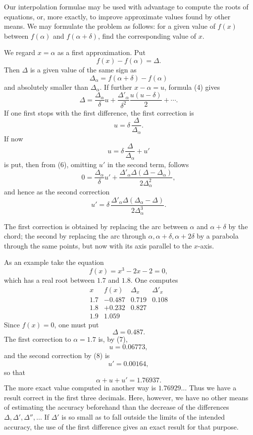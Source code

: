 \documentclass[11pt]{article}
\begin{document}
Our interpolation formulae may be used with advantage to compute the roots of equations, or, more exactly, to improve approximate values found by other means. We may formulate the problem as follows: for a given value of $f(x)$ between $f(\alpha)$ and $f(\alpha+\delta)$, find the corresponding value of $x$.

We regard $x=\alpha$ as a first approximation. Put
\[
        f(x)-f(\alpha)=\Delta.
\]
Then $\Delta$ is a given value of the same sign as
\[
        \Delta_\alpha=f(\alpha+\delta)-f(\alpha)
\]
and absolutely smaller than $\Delta_\alpha$. If further $x-\alpha=u$, formula (4) gives
\begin{equation}
        \Delta=\frac{\Delta_\alpha}{\delta}u+
        \frac{\Delta'_\alpha}{\delta^2}\frac{u(u-\delta)}2+\cdots .
\tag{6}
\end{equation}
If one first stops with the first difference, the first correction is
\begin{equation}
        u=\delta\,\frac{\Delta}{\Delta_\alpha}.
\tag{7}
\end{equation}
If now
\[
        u=\delta\,\frac{\Delta}{\Delta_\alpha}+u'
\]
is put, then from (6), omitting $u'$ in the second term, follows
\[
        0=\frac{\Delta_\alpha}{\delta}u'
        +\frac{\Delta'_\alpha\Delta(\Delta-\Delta_\alpha)}
               {2\Delta_\alpha^2},
\]
and hence as the second correction
\begin{equation}
        u'=\delta\,\frac{\Delta'_\alpha\Delta(\Delta_\alpha-\Delta)}
                     {2\Delta_\alpha^3}.
\tag{8}
\end{equation}

The first correction is obtained by replacing the arc between $\alpha$ and $\alpha+\delta$ by the chord; the second by replacing the arc through $\alpha,\alpha+\delta,\alpha+2\delta$ by a parabola through the same points, but now with its axis parallel to the $x$-axis.

As an example take the equation
\[
        f(x)=x^3-2x-2=0,
\]
which has a real root between $1.7$ and $1.8$. One computes
\[
\begin{array}{c|c|c|c}
x&f(x)&\Delta_x&\Delta'_x\\ \hline
1.7&-0.487&0.719&0.108\\
1.8&+0.232&0.827&\\
1.9&1.059&&
\end{array}
\]
Since $f(x)=0$, one must put
\[
        \Delta=0.487.
\]
The first correction to $\alpha=1.7$ is, by (7),
\[
        u=0.06773,
\]
and the second correction by (8) is
\[
        u'=0.00164,
\]
so that
\[
        \alpha+u+u'=1.76937.
\]
The more exact value computed in another way is $1.76929\ldots$ Thus we have a result correct in the first three decimals. Here, however, we have no other means of estimating the accuracy beforehand than the decrease of the differences $\Delta,\Delta',\Delta'',\ldots$ If $\Delta'$ is so small as to fall outside the limits of the intended accuracy, the use of the first difference gives an exact result for that purpose.
\end{document}
